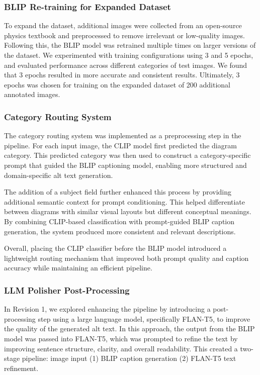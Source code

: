 \documentclass[11pt]{article}
\begin{document}
\subsubsection{BLIP Re-training for Expanded Dataset} 
To expand the dataset, additional images were collected from an open-source physics textbook and preprocessed to 
remove irrelevant or low-quality images. 
Following this, the BLIP model was retrained multiple times on larger versions of the dataset.
We experimented with training configurations using 3 and 5 epochs, and evaluated performance across different categories of test images. 
We found that 3 epochs resulted in more accurate and consistent results. Ultimately, 3 epochs was chosen for training on the expanded dataset of 200 additional annotated images. 

\subsubsection{Category Routing System}

The category routing system was implemented as a preprocessing step in the pipeline. For each input image, the CLIP model first predicted the diagram category. This predicted category was then used to construct a category-specific prompt that guided the BLIP captioning model, enabling more structured and domain-specific alt text generation.

The addition of a subject field further enhanced this process by providing additional semantic context for prompt conditioning. This helped differentiate between diagrams with similar visual layouts but different conceptual meanings. By combining CLIP-based classification with prompt-guided BLIP caption generation, the system produced more consistent and relevant descriptions.

Overall, placing the CLIP classifier before the BLIP model introduced a lightweight routing mechanism that improved both prompt quality and caption accuracy while maintaining an efficient pipeline.

\subsubsection{LLM Polisher Post-Processing}
In Revision 1, we explored enhancing the pipeline by introducing a post-processing step using a large language model, specifically FLAN-T5, 
to improve the quality of the generated alt text. In this approach, the output from the BLIP model was passed into FLAN-T5, which was 
prompted to refine the text by improving sentence structure, clarity, and overall readability. This created a two-stage pipeline: 
image input (1) BLIP caption generation (2) FLAN-T5 text refinement.
\end{document}
